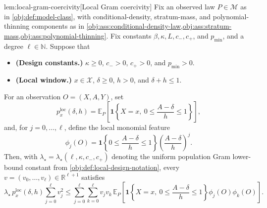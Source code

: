\documentclass[11pt]{article}
\begin{document}
\begin{lemmav}{lem:local-gram-coercivity}[Local Gram coercivity]
Fix an observed law \(P\in\mathcal M\) as in \cref{obj:def:model-class}, with conditional-density, stratum-mass, and polynomial-thinning components as in \cref{obj:ass:conditional-density-law,obj:ass:stratum-mass,obj:ass:polynomial-thinning}.  Fix constants \(\beta,\kappa,L,c_-,c_+\), and \(p_{\min}\), and a degree \(\ell\in\mathbb N\).  Suppose that
\begin{itemize}
\item \textbf{(Design constants.)} \(\kappa\ge0\), \(c_->0\), \(c_+>0\), and \(p_{\min}>0\).
\item \textbf{(Local window.)} \(x\in\mathcal X\), \(\delta\ge0\), \(h>0\), and \(\delta+h\le1\).
\end{itemize}
For an observation \(O=(X,A,Y)\), set
\[
p_x^{\mathrm{loc}}(\delta,h)
=
\mathbb E_P\!\left[
\mathbf 1\!\left\{X=x,\ 0\le \frac{A-\delta}{h}\le 1\right\}
\right],
\]
and, for \(j=0,\ldots,\ell\), define the local monomial feature
\[
\phi_j(O)
=
\mathbf 1\!\left\{0\le \frac{A-\delta}{h}\le 1\right\}
\left(\frac{A-\delta}{h}\right)^j .
\]
Then, with \(\lambda_\star=\lambda_\star(\ell,\kappa,c_-,c_+)\) denoting the uniform population Gram lower-bound constant from \cref{obj:def:local-design-notation}, every \(v=(v_0,\ldots,v_\ell)\in\mathbb R^{\ell+1}\) satisfies
\[
\lambda_\star\,p_x^{\mathrm{loc}}(\delta,h)\sum_{j=0}^{\ell}v_j^2
\le
\sum_{j=0}^{\ell}\sum_{k=0}^{\ell}
v_jv_k\,
\mathbb E_P\!\left[
\mathbf 1\!\left\{X=x,\ 0\le \frac{A-\delta}{h}\le 1\right\}
\phi_j(O)\phi_k(O)
\right].
\]
\end{lemmav}
\end{document}
